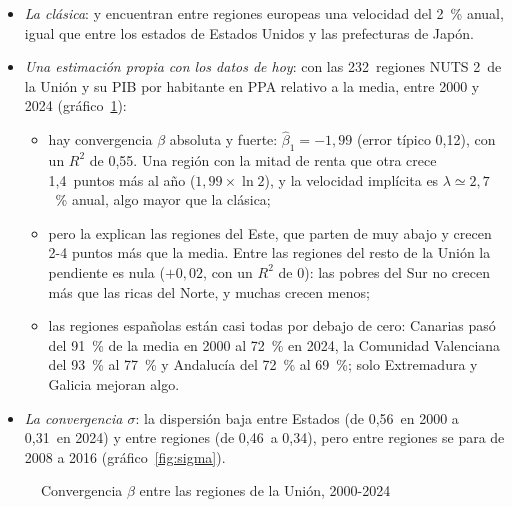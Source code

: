 \documentclass[11pt]{article}
\begin{document}
\begin{itemize}
\item \emph{La clásica}: \textcite{BarroSalaiMartin1991} y \textcite{SalaiMartin1996Regional} encuentran entre regiones europeas una velocidad del 2~\% anual, igual que entre los estados de Estados Unidos y las prefecturas de Japón.
\item \emph{Una estimación propia con los datos de hoy}: con las 232~regiones NUTS 2~de la Unión y su PIB por habitante en PPA relativo a la media, entre 2000 y 2024 (gráfico~\ref{fig:convergencia-regional})\nocite{Eurostat2026Regional}:
  \begin{itemize}
  \item hay convergencia $\beta$ absoluta y fuerte: $\hat\beta_1=-1{,}99$ (error típico 0,12), con un $R^2$ de 0,55. Una región con la mitad de renta que otra crece 1,4~puntos más al año ($1{,}99\times\ln2$), y la velocidad implícita es $\lambda\simeq2{,}7$~\% anual, algo mayor que la clásica;
  \item pero la explican las regiones del Este, que parten de muy abajo y crecen 2-4 puntos más que la media. Entre las regiones del resto de la Unión la pendiente es nula ($+0{,}02$, con un $R^2$ de 0): las pobres del Sur no crecen más que las ricas del Norte, y muchas crecen menos;
  \item las regiones españolas están casi todas por debajo de cero: Canarias pasó del 91~\% de la media en 2000 al 72~\% en 2024, la Comunidad Valenciana del 93~\% al 77~\% y Andalucía del 72~\% al 69~\%; solo Extremadura y Galicia mejoran algo.
  \end{itemize}
\item \emph{La convergencia $\sigma$}: la dispersión baja entre Estados (de 0,56~en 2000 a 0,31~en 2024) y entre regiones (de 0,46~a 0,34), pero entre regiones se para de 2008 a 2016 (gráfico~\ref{fig:sigma}).
\end{itemize}

\begin{figure}[H]
\centering
\caption{Convergencia $\beta$ entre las regiones de la Unión, 2000-2024}\label{fig:convergencia-regional}
\end{figure}
\end{document}
